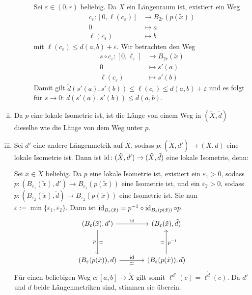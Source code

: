 \begin{beweis}
\begin{enumerate}[(i)]
\begin{description}
			Sei $\varepsilon \in (0,r)$ beliebig.
			Da $X$ ein Längenraum ist, existiert ein Weg
			\begin{align*}
				c_\varepsilon\colon [0,\ell(c_\varepsilon)] &\longrightarrow B_{2r}(p(\tilde{x})) \\
				0 &\longmapsto a \\
				\ell(c_\varepsilon) &\longmapsto b
			\end{align*}
			mit $\ell(c_\varepsilon) \leq d(a,b) + \varepsilon$.
			Wir betrachten den Weg
			\begin{align*}
				s \circ c_\varepsilon\colon [0,\ell_\varepsilon] &\longrightarrow B_{2r}(\tilde{x}) \\
				0 &\longmapsto s'(a) \\
				\ell(c_\varepsilon) &\longmapsto s'(b)
			\end{align*}
			Damit gilt $\tilde{d}(s'(a),s'(b)) \leq \ell(c_\varepsilon) \leq d(a,b) + \varepsilon$ und es folgt für $s \rightarrow 0$: $\tilde{d}(s'(a),s'(b)) \leq d(a,b)$.
		\end{description}
		\item Da $p$ eine lokale Isometrie ist, ist die Länge von einem Weg in $(\tilde{X},\tilde{d})$ dieselbe wie die Länge von dem Weg unter $p$.
		\item Sei $d'$ eine andere Längenmetrik auf $\tilde{X}$, sodass $p \colon (\tilde{X},d') \rightarrow (X,d)$ eine lokale Isometrie ist.
		Dann ist $\operatorname{id}\colon (\tilde{X},d') \rightarrow (\tilde{X},\tilde{d})$ eine lokale Isometrie, denn:
		
		Sei $\tilde{x} \in \tilde{X}$ beliebig.
		Da $p$ eine lokale Isometrie ist, existiert ein $\varepsilon_1 > 0$, sodass $p \colon (B_{\varepsilon_1}(\tilde{x}),d') \rightarrow B_{\varepsilon_1}(p(\tilde{x}))$ eine Isometrie ist, und ein $\varepsilon_2 > 0$, sodass $p \colon (B_{\varepsilon_2}(\tilde{x}),\tilde{d}) \rightarrow B_{\varepsilon_2}(p(\tilde{x}))$ eine Isometrie ist.
		Sie nun $\varepsilon := \min\{\varepsilon_1,\varepsilon_2\}$.
		Dann ist $\operatorname{id}_{B_\varepsilon(\tilde{x})} = p^{-1} \circ \operatorname{id}_{B_\varepsilon(p(\tilde{x}))} \circ p$.
		\[
		\begin{tikzcd}[column sep=large, row sep=huge]
			(B_\varepsilon(\tilde{x}),d') \arrow{r}{\id} \arrow[d,"\simeq","p"'] & (B_\varepsilon(\tilde{x}),\tilde{d}) \\
			(B_\varepsilon(p(\tilde{x})),d) \arrow[r,"\id","\simeq"'] & (B_\varepsilon(p(\tilde{x})),d) \arrow[u,"\simeq","p^{-1}"']
		\end{tikzcd}
		\]
		Für einen beliebigen Weg $c \colon [a,b] \rightarrow \tilde{X}$ gilt somit $\ell^{d'}(c) = \ell^{\tilde{d}}(c)$.
		Da $d'$ und $\tilde{d}$ beide Längenmetriken sind, stimmen sie überein. \qedhere
	\end{enumerate}
\end{beweis}

